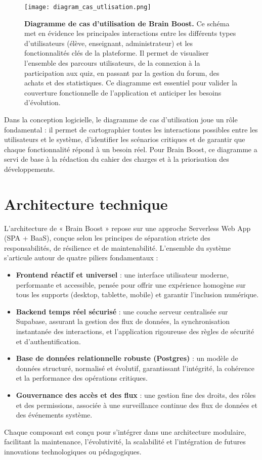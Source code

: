 \documentclass[a4paper,11pt]{report}
\begin{document}
\clearpage
\newpage
\begin{figure}[p]
    \centering
    \texttt{[image: diagram\_cas\_utlisation.png]}
    \newpage
    \caption{\textbf{Diagramme de cas d'utilisation de Brain Boost.} Ce schéma met en évidence les principales interactions entre les différents types d'utilisateurs (élève, enseignant, administrateur) et les fonctionnalités clés de la plateforme. Il permet de visualiser l'ensemble des parcours utilisateurs, de la connexion à la participation aux quiz, en passant par la gestion du forum, des achats et des statistiques. Ce diagramme est essentiel pour valider la couverture fonctionnelle de l'application et anticiper les besoins d'évolution.}
\end{figure}
\clearpage
Dans la conception logicielle, le diagramme de cas d'utilisation joue un rôle fondamental : il permet de cartographier toutes les interactions possibles entre les utilisateurs et le système, d'identifier les scénarios critiques et de garantir que chaque fonctionnalité répond à un besoin réel. Pour Brain Boost, ce diagramme a servi de base à la rédaction du cahier des charges et à la priorisation des développements.

\section{Architecture technique}

L'architecture de « Brain Boost » repose sur une approche Serverless Web App (SPA + BaaS), conçue selon les principes de séparation stricte des responsabilités, de résilience et de maintenabilité. L'ensemble du système s'articule autour de quatre piliers fondamentaux :
\begin{itemize}
    \item \textbf{Frontend réactif et universel} : une interface utilisateur moderne, performante et accessible, pensée pour offrir une expérience homogène sur tous les supports (desktop, tablette, mobile) et garantir l'inclusion numérique.
    \item \textbf{Backend temps réel sécurisé} : une couche serveur centralisée sur Supabase, assurant la gestion des flux de données, la synchronisation instantanée des interactions, et l'application rigoureuse des règles de sécurité et d'authentification.
    \item \textbf{Base de données relationnelle robuste (Postgres)} : un modèle de données structuré, normalisé et évolutif, garantissant l'intégrité, la cohérence et la performance des opérations critiques.
    \item \textbf{Gouvernance des accès et des flux} : une gestion fine des droits, des rôles et des permissions, associée à une surveillance continue des flux de données et des événements système.
\end{itemize}
Chaque composant est conçu pour s'intégrer dans une architecture modulaire, facilitant la maintenance, l'évolutivité, la scalabilité et l'intégration de futures innovations technologiques ou pédagogiques.
\end{document}
